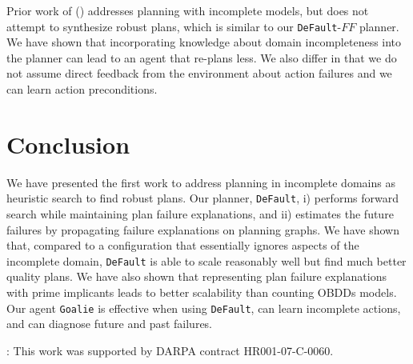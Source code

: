 \documentclass[letterpaper]{article}
\def\und#1{\noindent{\bf #1}:}
\def\default{{\tt DeFault}}
\def\goalie{{\tt Goalie}}
\def\citet#1{\citeauthor{#1} (\citeyear{#1})}
\begin{document}
Prior work of \citet{DBLP:conf/aips/ChangA06} addresses planning with incomplete
models, but does not attempt to synthesize robust plans, which is similar to our
\default{}-$FF$ planner.  We have shown that incorporating knowledge about
domain incompleteness into the planner can lead to an agent that re-plans less. 
We also differ in that we do not assume direct feedback from the environment about
action failures and we can learn action preconditions.

\section{Conclusion}

We have presented the first work to address planning in incomplete domains as
heuristic search to find robust plans.  Our planner, \default{}, i) performs
forward search while maintaining plan failure explanations, and ii) estimates
the future failures by propagating failure explanations on planning graphs.  We
have shown that, compared to a configuration that essentially ignores aspects of
the incomplete domain, \default{} is able to scale reasonably well but find much
better quality plans.  We have also shown that representing plan failure
explanations with prime implicants leads to better scalability than counting
OBDDs models.  Our agent \goalie{} is  effective when using \default{}, can
learn  incomplete actions, and can diagnose future and past failures.


\und{Acknowledgements} This work was supported by DARPA contract HR001-07-C-0060.



 
\end{document}
